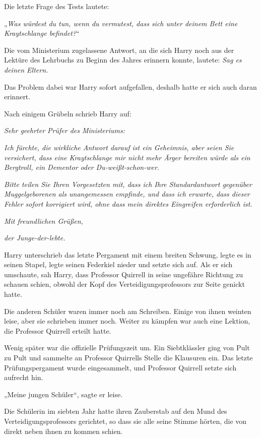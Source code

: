 {Die letzte Frage des Tests lautete:

„\emph{Was würdest du tun, wenn du vermutest, dass sich unter deinem Bett eine Kraytschlange befindet?}“

Die vom Ministerium zugelassene Antwort, an die sich Harry noch aus der Lektüre des Lehrbuchs zu Beginn des Jahres erinnern konnte, lautete: \emph{Sag es deinen Eltern.}

Das Problem dabei war Harry sofort aufgefallen, deshalb hatte er sich auch daran erinnert.

Nach einigem Grübeln schrieb Harry auf:

\emph{Sehr geehrter Prüfer des Ministeriums:}

\emph{Ich fürchte, die wirkliche Antwort darauf ist ein Geheimnis, aber seien Sie versichert, dass eine Kraytschlange mir nicht mehr Ärger bereiten würde als ein Bergtroll, ein Dementor oder Du-weißt-schon-wer.}

\emph{\hfill\break Bitte teilen Sie Ihren Vorgesetzten mit, dass ich Ihre Standardantwort gegenüber} \emph{Muggelgeborenen als unangemessen empfinde, und dass ich erwarte, dass dieser Fehler sofort korrigiert wird, ohne dass mein direktes Eingreifen erforderlich ist.}

\emph{\hfill\break Mit freundlichen Grüßen,}

\emph{der Junge-der-lebte.}

Harry unterschrieb das letzte Pergament mit einem breiten Schwung, legte es in seinen Stapel, legte seinen Federkiel nieder und setzte sich auf. Als er sich umschaute, sah Harry, dass Professor Quirrell in seine ungefähre Richtung zu schauen schien, obwohl der Kopf des Verteidigungsprofessors zur Seite genickt hatte.

Die anderen Schüler waren immer noch am Schreiben. Einige von ihnen weinten leise, aber sie schrieben immer noch. Weiter zu kämpfen war auch eine Lektion, die Professor Quirrell erteilt hatte.

Wenig später war die offizielle Prüfungszeit um. Ein Siebtklässler ging von Pult zu Pult und sammelte an Professor Quirrells Stelle die Klausuren ein. Das letzte Prüfungspergament wurde eingesammelt, und Professor Quirrell setzte sich aufrecht hin.

„Meine jungen Schüler“, sagte er leise.

Die Schülerin im siebten Jahr hatte ihren Zauberstab auf den Mund des Verteidigungsprofessors gerichtet, so dass sie alle seine Stimme hörten, die von direkt neben ihnen zu kommen schien.

}
